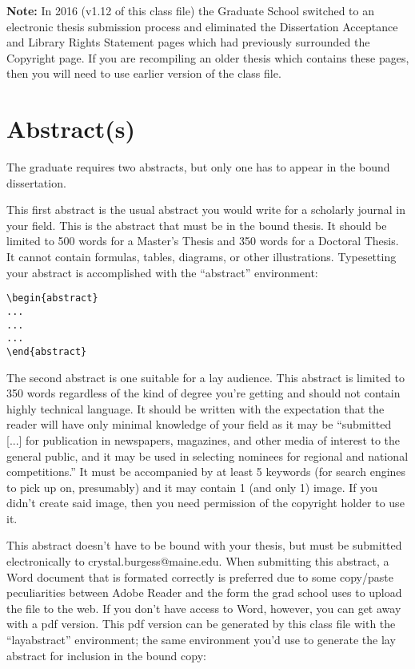 \textbf{Note:} In 2016 (v1.12 of this class file) the Graduate School switched to an electronic thesis submission process and eliminated the Dissertation Acceptance and Library Rights Statement pages which had previously surrounded the Copyright page.  If you are recompiling an older thesis which contains these pages, then you will need to use earlier version of the class file.

\section{Abstract(s)}\label{abstracts}
The graduate requires two abstracts, but only one has to appear in the bound dissertation.

This first abstract is the usual abstract you would write for a scholarly journal in your field.  This is the abstract that must be in the bound thesis.  It should be limited to 500 words for a Master's Thesis and 350 words for a Doctoral Thesis.  It cannot contain formulas, tables, diagrams, or other illustrations.  Typesetting your abstract is accomplished with the ``abstract'' environment:
\begin{verbatim}
\begin{abstract}
...
...
...
\end{abstract}
\end{verbatim}

The second abstract is one suitable for a lay audience.  This abstract is limited to 350 words regardless of the kind of degree you're getting and should not contain highly technical language.  It should be written with the expectation that the reader will have only minimal knowledge of your field as it may be ``submitted [...] for publication in newspapers, magazines, and other media of
interest to the general public, and it may be used in selecting nominees for regional and
national competitions.''  It must be accompanied by at least 5 keywords (for search engines to pick up on, presumably) and it may contain 1 (and only 1) image.  If you didn't create said image, then you need permission of the copyright holder to use it.

This abstract doesn't have to be bound with your thesis, but must be submitted electronically to crystal.burgess@maine.edu.  When submitting this abstract, a Word document that is formated correctly is preferred due to some copy/paste peculiarities between Adobe Reader and the form the grad school uses to upload the file to the web.  If you don't have access to Word, however, you can get away with a pdf version.  This pdf version can be generated by this class file with the ``layabstract'' environment; the same environment you'd use to generate the lay abstract for inclusion in the bound copy:

